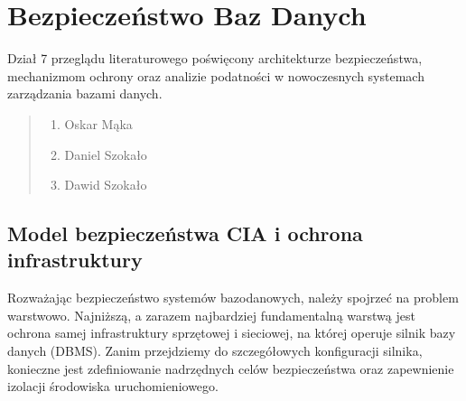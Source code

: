\documentclass[letterpaper,10pt,polish]{sphinxmanual}
\begin{document}
\section{Bezpieczeństwo Baz Danych}
\label{\detokenize{rozdzia_u0142_2/rozdzia_u0142_27/index:bezpieczenstwo-baz-danych}}\label{\detokenize{rozdzia_u0142_2/rozdzia_u0142_27/index::doc}}
\sphinxAtStartPar
Dział 7 przeglądu literaturowego poświęcony architekturze bezpieczeństwa, mechanizmom ochrony oraz analizie podatności w nowoczesnych systemach zarządzania bazami danych.
\begin{quote}\begin{description}
\begin{enumerate}
%
\item {} 
\sphinxAtStartPar
Oskar Mąka

\item {} 
\sphinxAtStartPar
Daniel Szokało

\item {} 
\sphinxAtStartPar
Dawid Szokało

\end{enumerate}

\end{description}\end{quote}

\sphinxstepscope


\subsection{Model bezpieczeństwa CIA i ochrona infrastruktury}
\label{\detokenize{rozdzia_u0142_2/rozdzia_u0142_27/rozdzial_1:model-bezpieczenstwa-cia-i-ochrona-infrastruktury}}\label{\detokenize{rozdzia_u0142_2/rozdzia_u0142_27/rozdzial_1::doc}}
\sphinxAtStartPar
Rozważając bezpieczeństwo systemów bazodanowych, należy spojrzeć na problem warstwowo. Najniższą, a zarazem najbardziej fundamentalną warstwą jest ochrona samej infrastruktury sprzętowej i sieciowej, na której operuje silnik bazy danych (DBMS). Zanim przejdziemy do szczegółowych konfiguracji silnika, konieczne jest zdefiniowanie nadrzędnych celów bezpieczeństwa oraz zapewnienie izolacji środowiska uruchomieniowego.
\end{document}
